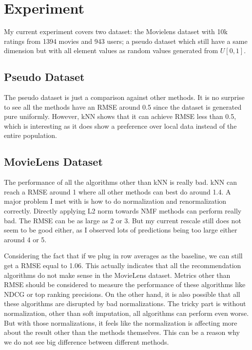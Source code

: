 \documentclass[paper=a4, fontsize=11pt]{scrartcl}
\numberwithin{equation}{section}        %
\numberwithin{figure}{section}          %
\numberwithin{table}{section}               %
\begin{document}
\section{Experiment}
My current experiment covers two dataset: the Movielens dataset with 10k ratings from 1394 movies and 943 users; a pseudo dataset which still have a same dimension but with all element values as random values generated from $U[0, 1]$. 

\subsection{Pseudo Dataset}
The pseudo dataset is just a comparison against other methods. It is no surprise to see all the methods have an RMSE around 0.5 since the dataset is generated pure uniformly. However, kNN shows that it can achieve RMSE less than 0.5, which is interesting as it does show a preference over local data instead of the entire population.

\subsection{MovieLens Dataset}
The performance of all the algorithms other than kNN is really bad. kNN can reach a RMSE around 1 where all other methods can best do around 1.4. A major problem I met with is how to do normalization and renormalization correctly. Directly applying L2 norm towards NMF methods can perform really bad. The RMSE can be as large as 2 or 3. But my current rescale still does not seem to be good either, as I observed lots of predictions being too large either around 4 or 5.

Considering the fact that if we plug in row averages as the baseline, we can still get a RMSE equal to 1.06. This actually indicates that all the recommendation algorithms do not make sense in the MovieLens dataset. Metrics other than RMSE should be considered to measure the performance of these algorithms like NDCG or top ranking precisions. On the other hand, it is also possible that all these algorithms are disrupted by bad normalizations. The tricky part is without normalization, other than soft imputation, all algorithms can perform even worse. But with those normalizations, it feels like the normalization is affecting more about the result other than the methods themselves. This can be a reason why we do not see big difference between different methods.
\end{document}

